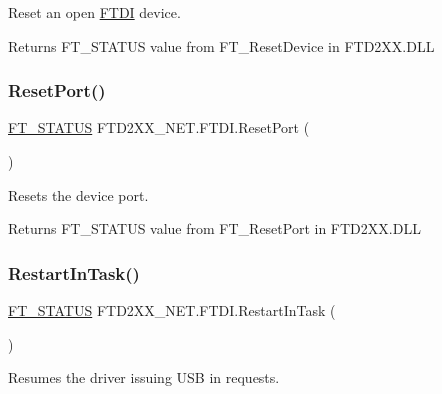 Reset an open \mbox{\hyperlink{class_f_t_d2_x_x___n_e_t_1_1_f_t_d_i}{F\+T\+DI}} device. 

\begin{DoxyReturn}{Returns}
F\+T\+\_\+\+S\+T\+A\+T\+US value from F\+T\+\_\+\+Reset\+Device in F\+T\+D2\+X\+X.\+D\+LL
\end{DoxyReturn}
\mbox{\label{class_f_t_d2_x_x___n_e_t_1_1_f_t_d_i_accb71a54d8a9463552e6cf471f1d905c}} 
\subsubsection{\texorpdfstring{ResetPort()}{ResetPort()}}
{\footnotesize\ttfamily \mbox{\hyperlink{class_f_t_d2_x_x___n_e_t_1_1_f_t_d_i_aabe20ad905cc4ccc1e35dd5b877d9a83}{F\+T\+\_\+\+S\+T\+A\+T\+US}} F\+T\+D2\+X\+X\+\_\+\+N\+E\+T.\+F\+T\+D\+I.\+Reset\+Port (\begin{DoxyParamCaption}{ }\end{DoxyParamCaption})}



Resets the device port. 

\begin{DoxyReturn}{Returns}
F\+T\+\_\+\+S\+T\+A\+T\+US value from F\+T\+\_\+\+Reset\+Port in F\+T\+D2\+X\+X.\+D\+LL
\end{DoxyReturn}
\mbox{\label{class_f_t_d2_x_x___n_e_t_1_1_f_t_d_i_a14336dac93e815f0f6f447d1f02dc4fd}} 
\subsubsection{\texorpdfstring{RestartInTask()}{RestartInTask()}}
{\footnotesize\ttfamily \mbox{\hyperlink{class_f_t_d2_x_x___n_e_t_1_1_f_t_d_i_aabe20ad905cc4ccc1e35dd5b877d9a83}{F\+T\+\_\+\+S\+T\+A\+T\+US}} F\+T\+D2\+X\+X\+\_\+\+N\+E\+T.\+F\+T\+D\+I.\+Restart\+In\+Task (\begin{DoxyParamCaption}{ }\end{DoxyParamCaption})}



Resumes the driver issuing U\+SB in requests. 


